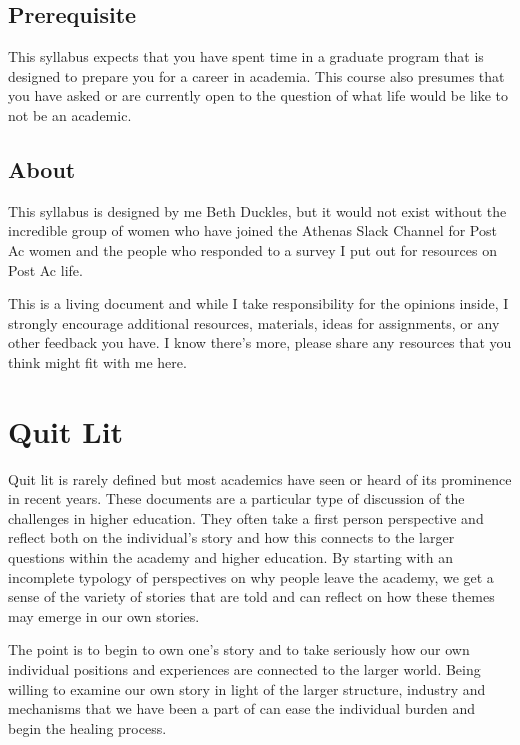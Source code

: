\documentclass[]{book}
\begin{document}
\section{Prerequisite}\label{prerequisite}

This syllabus expects that you have spent time in a graduate program
that is designed to prepare you for a career in academia. This course
also presumes that you have asked or are currently open to the question
of what life would be like to not be an academic.

\section{About}\label{about}

This syllabus is designed by me Beth Duckles, but it would not exist
without the incredible group of women who have joined the Athenas Slack
Channel for Post Ac women and the people who responded to a survey I put
out for resources on Post Ac life.

This is a living document and while I take responsibility for the
opinions inside, I strongly encourage additional resources, materials,
ideas for assignments, or any other feedback you have. I know there's
more, please share any resources that you think might fit with me here.

\chapter{Quit Lit}\label{quit-lit}

Quit lit is rarely defined but most academics have seen or heard of its
prominence in recent years. These documents are a particular type of
discussion of the challenges in higher education. They often take a
first person perspective and reflect both on the individual's story and
how this connects to the larger questions within the academy and higher
education. By starting with an incomplete typology of perspectives on
why people leave the academy, we get a sense of the variety of stories
that are told and can reflect on how these themes may emerge in our own
stories.

The point is to begin to own one's story and to take seriously how our
own individual positions and experiences are connected to the larger
world. Being willing to examine our own story in light of the larger
structure, industry and mechanisms that we have been a part of can ease
the individual burden and begin the healing process.
\end{document}
